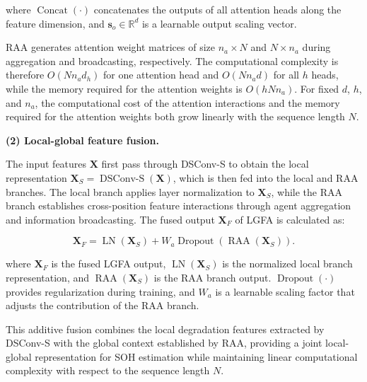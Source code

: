 where $\operatorname{Concat}(\cdot)$ concatenates the outputs of all attention heads along the feature dimension, and $\mathbf s_o\in\mathbb R^d$ is a learnable output scaling vector.

RAA generates attention weight matrices of size $n_a\times N$ and $N\times n_a$ during aggregation and broadcasting, respectively. The computational complexity is therefore $O(Nn_ad_h)$ for one attention head and $O(Nn_ad)$ for all $h$ heads, while the memory required for the attention weights is $O(hNn_a)$. For fixed $d$, $h$, and $n_a$, the computational cost of the attention interactions and the memory required for the attention weights both grow linearly with the sequence length $N$.

\textbf{(2) Local-global feature fusion.}

The input features $\mathbf X$ first pass through DSConv-S to obtain the local representation $\mathbf X_S=\operatorname{DSConv\text{-}S}(\mathbf X)$, which is then fed into the local and RAA branches. The local branch applies layer normalization to $\mathbf X_S$, while the RAA branch establishes cross-position feature interactions through agent aggregation and information broadcasting. The fused output $\mathbf X_F$ of LGFA is calculated as:

\begin{equation}
\mathbf X_F
=
\operatorname{LN}(\mathbf X_S)
+
W_a
\operatorname{Dropout}
\left(
\operatorname{RAA}(\mathbf X_S)
\right).
\label{eq:lgfa_fusion}
\end{equation}

where $\mathbf X_F$ is the fused LGFA output, $\operatorname{LN}(\mathbf X_S)$ is the normalized local branch representation, and $\operatorname{RAA}(\mathbf X_S)$ is the RAA branch output. $\operatorname{Dropout}(\cdot)$ provides regularization during training\cite{ref75}, and $W_a$ is a learnable scaling factor that adjusts the contribution of the RAA branch.

This additive fusion combines the local degradation features extracted by DSConv-S with the global context established by RAA, providing a joint local-global representation for SOH estimation while maintaining linear computational complexity with respect to the sequence length $N$.


